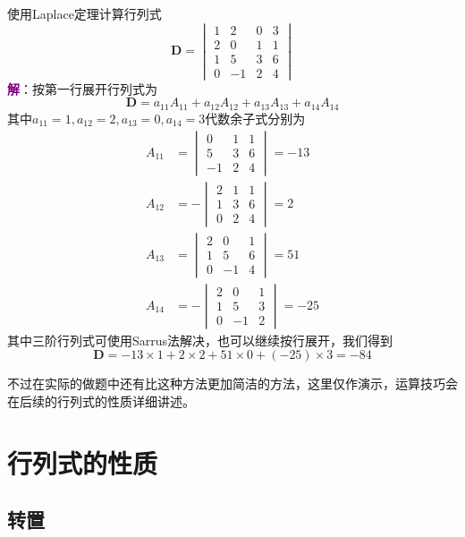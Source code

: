 \begin{example}
	使用Laplace定理计算行列式$$\mathbf{D}=\begin{vmatrix}
		1 & 2 & 0 & 3\\
		2 & 0 & 1 & 1\\
		1 & 5 & 3 & 6\\
		0 & -1 & 2 & 4
	\end{vmatrix}$$
	\tcblower
	\textcolor{purple}{\textbf{解}}：按第一行展开行列式为$$\mathbf{D}=a_{11}A_{11}+a_{12}A_{12}+a_{13}A_{13}+a_{14}A_{14}$$其中$a_{11}=1,a_{12}=2,a_{13}=0,a_{14}=3$代数余子式分别为\begin{align}
		A_{11}&=\begin{vmatrix}
			0 & 1 & 1\\
			5 & 3 & 6\\
			-1 & 2 & 4
		   \end{vmatrix}=-13\\
		A_{12}&=-\begin{vmatrix}
			2 & 1 & 1\\
			1 & 3 & 6\\
			0 & 2 & 4
		   \end{vmatrix}=2\\
		A_{13}&=\begin{vmatrix}
			2 & 0 & 1\\
			1 & 5 & 6\\
			0 & -1 & 4
		   \end{vmatrix}=51\\
		A_{14}&=-\begin{vmatrix}
			2 & 0 & 1\\
			1 & 5 & 3\\
			0 & -1 & 2
		   \end{vmatrix}=-25
	\end{align}
	其中三阶行列式可使用Sarrus法解决，也可以继续按行展开，我们得到$$\mathbf{D}=-13\times 1+2\times 2+51\times 0+(-25)\times 3=-84$$
\end{example}

不过在实际的做题中还有比这种方法更加简洁的方法，这里仅作演示，运算技巧会在后续的行列式的性质详细讲述。

\section{行列式的性质}

\subsection{转置}

